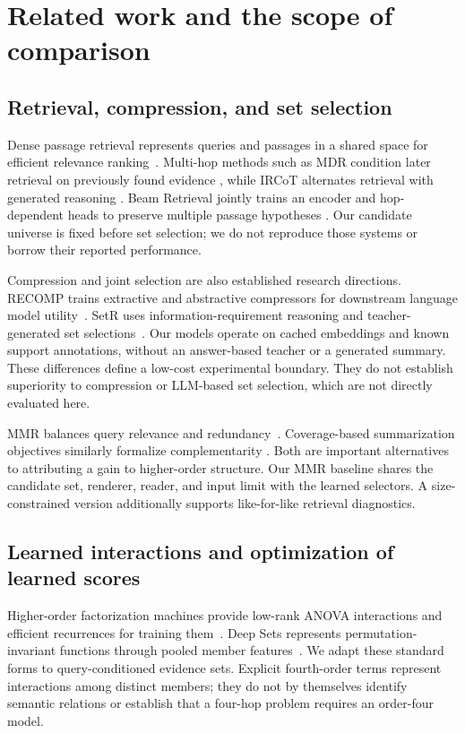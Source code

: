 \documentclass[pdflatex,sn-mathphys-num]{sn-jnl}
\begin{document}
\section{Related work and the scope of comparison}
\subsection{Retrieval, compression, and set selection}
Dense passage retrieval represents queries and passages in a shared space
for efficient relevance ranking~\cite{karpukhin2020dpr}. Multi-hop methods
such as MDR condition later retrieval on previously found evidence
\cite{xiong2021mdr}, while IRCoT alternates retrieval with generated reasoning
\cite{trivedi2023ircot}. Beam Retrieval jointly trains an encoder and
hop-dependent heads to preserve multiple passage hypotheses
\cite{zhang2024beam}. Our candidate universe is fixed before set selection;
we do not reproduce those systems or borrow their reported performance.

Compression and joint selection are also established research directions.
RECOMP trains extractive and abstractive compressors for downstream language
model utility~\cite{xu2024recomp}. SetR uses information-requirement reasoning
and teacher-generated set selections~\cite{lee2025setr}. Our models operate
on cached embeddings and known support annotations, without an answer-based
teacher or a generated summary. These differences define a low-cost
experimental boundary. They do not establish superiority to compression or
LLM-based set selection, which are not directly evaluated here.

MMR balances query relevance and redundancy~\cite{carbonell1998mmr}.
Coverage-based summarization objectives similarly formalize complementarity
\cite{lin2011submodular}. Both are important alternatives to attributing a
gain to higher-order structure. Our MMR baseline shares the candidate set,
renderer, reader, and input limit with the learned selectors. A
size-constrained version additionally supports like-for-like retrieval
diagnostics.

\subsection{Learned interactions and optimization of learned scores}
Higher-order factorization machines provide low-rank ANOVA interactions
and efficient recurrences for training them~\cite{blondel2016hofm}.
Deep Sets represents permutation-invariant functions through pooled member
features~\cite{zaheer2017deepsets}. We adapt these standard forms to
query-conditioned evidence sets. Explicit fourth-order terms represent
interactions among distinct members; they do not by themselves identify
semantic relations or establish that a four-hop problem requires an
order-four model.
\end{document}
